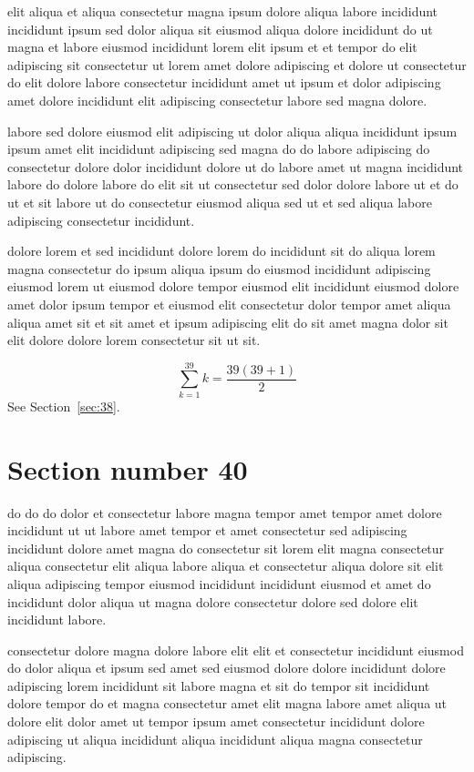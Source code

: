 \documentclass{article}
\begin{document}
elit aliqua et aliqua consectetur magna ipsum dolore aliqua labore incididunt incididunt ipsum sed dolor aliqua sit eiusmod aliqua dolore incididunt do ut magna et labore eiusmod incididunt lorem elit ipsum et et tempor do elit adipiscing sit consectetur ut lorem amet dolore adipiscing et dolore ut consectetur do elit dolore labore consectetur incididunt amet ut ipsum et dolor adipiscing amet dolore incididunt elit adipiscing consectetur labore sed magna dolore.

labore sed dolore eiusmod elit adipiscing ut dolor aliqua aliqua incididunt ipsum ipsum amet elit incididunt adipiscing sed magna do do labore adipiscing do consectetur dolore dolor incididunt dolore ut do labore amet ut magna incididunt labore do dolore labore do elit sit ut consectetur sed dolor dolore labore ut et do ut et sit labore ut do consectetur eiusmod aliqua sed ut et sed aliqua labore adipiscing consectetur incididunt.

dolore lorem et sed incididunt dolore lorem do incididunt sit do aliqua lorem magna consectetur do ipsum aliqua ipsum do eiusmod incididunt adipiscing eiusmod lorem ut eiusmod dolore tempor eiusmod elit incididunt eiusmod dolore amet dolor ipsum tempor et eiusmod elit consectetur dolor tempor amet aliqua aliqua amet sit et sit amet et ipsum adipiscing elit do sit amet magna dolor sit elit dolore dolore lorem consectetur sit ut sit.

\begin{equation} \sum_{k=1}^{39} k = \frac{39(39+1)}{2} \end{equation}
See Section~\ref{sec:38}.

\section{Section number 40}\label{sec:40}
do do do dolor et consectetur labore magna tempor amet tempor amet dolore incididunt ut ut labore amet tempor et amet consectetur sed adipiscing incididunt dolore amet magna do consectetur sit lorem elit magna consectetur aliqua consectetur elit aliqua labore aliqua et consectetur aliqua dolore sit elit aliqua adipiscing tempor eiusmod incididunt incididunt eiusmod et amet do incididunt dolor aliqua ut magna dolore consectetur dolore sed dolore elit incididunt labore.

consectetur dolore magna dolore labore elit elit et consectetur incididunt eiusmod do dolor aliqua et ipsum sed amet sed eiusmod dolore dolore incididunt dolore adipiscing lorem incididunt sit labore magna et sit do tempor sit incididunt dolore tempor do et magna consectetur amet elit magna labore amet aliqua ut dolore elit dolor amet ut tempor ipsum amet consectetur incididunt dolore adipiscing ut aliqua incididunt aliqua incididunt aliqua magna consectetur adipiscing.
\end{document}
